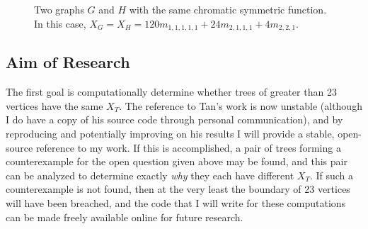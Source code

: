 \documentclass[a4paper,12pt]{article}
\begin{document}
\begin{spacing}{1}
\begin{figure}[t]
\begin{center}
\hspace{1cm}
\caption{Two graphs $G$ and $H$ with the same chromatic symmetric function. In this case, $X_G = X_H = 120m_{1,1,1,1,1} + 24m_{2,1,1,1} + 4m_{2,2,1}$.}
\end{center}
\end{figure}

\subsection*{Aim of Research}
The first goal is computationally determine whether trees of greater than 23 vertices have the same $X_T$. The reference to Tan's work \cite{tantrees} is now unstable (although I do have a copy of his source code through personal communication), and by reproducing and potentially improving on his results I will provide a stable, open-source reference to my work. If this is accomplished, a pair of trees forming a counterexample for the open question given above may be found, and this pair can be analyzed to determine exactly \emph{why} they each have different $X_T$. If such a counterexample is not found, then at the very least the boundary of 23 vertices will have been breached, and the code that I will write for these computations can be made freely available online for future research.


\end{spacing}
\end{document}
